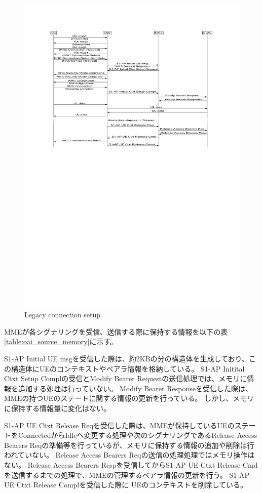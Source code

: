 \documentclass[a4j]{ujarticle}
\begin{document}
\begin{figure}[htbp]
  \centering
  \includegraphics[width=0.9\hsize]{Legacy_connection_setup.pdf}
  \caption{Legacy connection setup}
  \label{Legacy_connection_setup}
\end{figure}


\clearpage
MMEが各シグナリングを受信、送信する際に保持する情報を以下の表\ref{table:oai_source_memory}に示す。

S1-AP Initial UE msgを受信した際は、約2KBの分の構造体を生成しており、この構造体にUEのコンテキストやベアラ情報を格納している。
S1-AP Initital Ctxt Setup Complの受信とModify Bearer Requestの送信処理では、メモリに情報を追加する処理は行っていない。
Modify Bearer Responseを受信した際は、MMEの持つUEのステートに関する情報の更新を行っている。
しかし、メモリに保持する情報量に変化はない。


S1-AP UE Ctxt Release Reqを受信した際は、MMEが保持しているUEのステートをConnectedからIdleへ変更する処理や次のシグナリングであるRelease Access Bearers Reqの準備等を行っているが、メモリに保持する情報の追加や削除は行われていない。
Release Access Bearers Reqの送信の処理処理ではメモリ操作はない。
Release Access Bearers Respを受信してからS1-AP UE Ctxt Release Cmdを送信するまでの処理で、MMEの管理するベアラ情報の更新を行う。
S1-AP UE Ctxt Release Complを受信した際に UEのコンテキストを削除している。
\end{document}
